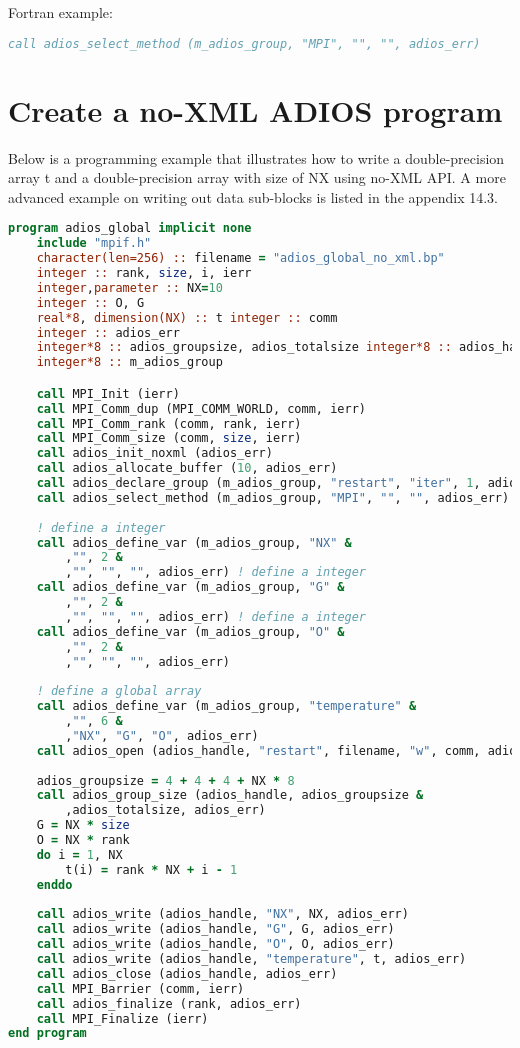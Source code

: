 Fortran example: 
\begin{lstlisting}[language=Fortran,caption={},label={}]
call adios_select_method (m_adios_group, "MPI", "", "", adios_err)
\end{lstlisting}

\section{Create a no-XML ADIOS program}

Below is a programming example that illustrates how to write a double-precision 
array t and a double-precision array with size of NX using no-XML API.   A more 
advanced example on writing out data sub-blocks is listed in the appendix 14.3. 

\begin{lstlisting}[language=Fortran,caption={ADIOS no-XML example},label={}]
program adios_global implicit none
	include "mpif.h"
	character(len=256) :: filename = "adios_global_no_xml.bp" 
	integer :: rank, size, i, ierr
	integer,parameter :: NX=10
	integer :: O, G
	real*8, dimension(NX) :: t integer :: comm
	integer :: adios_err
	integer*8 :: adios_groupsize, adios_totalsize integer*8 :: adios_handle
	integer*8 :: m_adios_group

	call MPI_Init (ierr)
	call MPI_Comm_dup (MPI_COMM_WORLD, comm, ierr)
	call MPI_Comm_rank (comm, rank, ierr) 
	call MPI_Comm_size (comm, size, ierr)
	call adios_init_noxml (adios_err)
	call adios_allocate_buffer (10, adios_err)
	call adios_declare_group (m_adios_group, "restart", "iter", 1, adios_err) 
	call adios_select_method (m_adios_group, "MPI", "", "", adios_err)
	
	! define a integer
	call adios_define_var (m_adios_group, "NX" & 
		,"", 2 &
		,"", "", "", adios_err) ! define a integer
	call adios_define_var (m_adios_group, "G" & 
		,"", 2 &
		,"", "", "", adios_err) ! define a integer
	call adios_define_var (m_adios_group, "O" & 
		,"", 2 &
		,"", "", "", adios_err)
		
	! define a global array
	call adios_define_var (m_adios_group, "temperature" & 
		,"", 6 &
		,"NX", "G", "O", adios_err)
	call adios_open (adios_handle, "restart", filename, "w", comm, adios_err)
	
	adios_groupsize = 4 + 4 + 4 + NX * 8
	call adios_group_size (adios_handle, adios_groupsize &
		,adios_totalsize, adios_err)
	G = NX * size 
	O = NX * rank 
	do i = 1, NX
		t(i) = rank * NX + i - 1 
	enddo
	
	call adios_write (adios_handle, "NX", NX, adios_err)
	call adios_write (adios_handle, "G", G, adios_err)
	call adios_write (adios_handle, "O", O, adios_err)
	call adios_write (adios_handle, "temperature", t, adios_err)
	call adios_close (adios_handle, adios_err) 
	call MPI_Barrier (comm, ierr)
	call adios_finalize (rank, adios_err)
	call MPI_Finalize (ierr) 
end program
\end{lstlisting}

